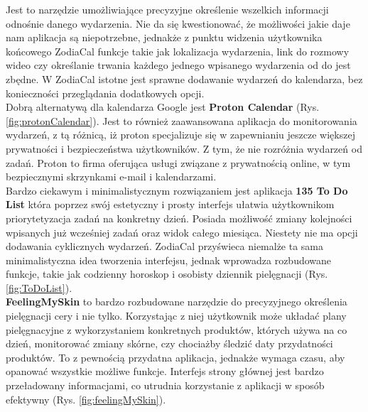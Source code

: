 Jest to narzędzie umożliwiające precyzyjne określenie wszelkich informacji odnośnie danego wydarzenia.
Nie da się kwestionować, że możliwości jakie daje nam aplikacja są niepotrzebne,
jednakże z punktu widzenia użytkownika końcowego ZodiaCal funkcje takie jak lokalizacja wydarzenia,
link do rozmowy wideo czy określanie trwania każdego jednego wpisanego wydarzenia od do jest zbędne.
W ZodiaCal istotne jest sprawne dodawanie wydarzeń do kalendarza, bez konieczności przeglądania dodatkowych opcji.\\

Dobrą alternatywą dla kalendarza Google jest \textbf{Proton Calendar} (Rys. \ref{fig:protonCalendar}).
Jest to również zaawansowana aplikacja do monitorowania wydarzeń, z tą różnicą,
iż proton specjalizuje się w zapewnianiu jeszcze większej prywatności i bezpieczeństwa użytkowników.
Z tym, że nie rozróżnia wydarzeń od zadań. Proton to firma oferująca usługi związane
z prywatnością online, w tym bezpiecznymi skrzynkami e-mail i kalendarzami.\\


Bardzo ciekawym i minimalistycznym rozwiązaniem jest aplikacja \textbf{135 To Do List} która poprzez swój estetyczny
i prosty interfejs ułatwia użytkownikom priorytetyzacja zadań na konkretny dzień.
Posiada możliwość zmiany kolejności wpisanych już wcześniej zadań oraz widok całego miesiąca.
Niestety nie ma opcji dodawania cyklicznych wydarzeń. ZodiaCal przyświeca niemalże ta sama minimalistyczna
idea tworzenia interfejsu, jednak wprowadza rozbudowane funkcje, takie jak codzienny horoskop i osobisty dziennik pielęgnacji (Rys. \ref{fig:ToDoList}).\\

\textbf{FeelingMySkin} to bardzo rozbudowane narzędzie do precyzyjnego określenia pielęgnacji cery i nie tylko.
Korzystając z niej użytkownik może układać plany pielęgnacyjne z wykorzystaniem konkretnych produktów,
których używa na co dzień, monitorować zmiany skórne, czy chociażby śledzić daty przydatności produktów.
To z pewnością przydatna aplikacja, jednakże wymaga czasu, aby opanować wszystkie możliwe funkcje.
Interfejs strony głównej jest bardzo przeładowany informacjami, co utrudnia korzystanie z aplikacji w sposób efektywny (Rys. \ref{fig:feelingMySkin}).\\

